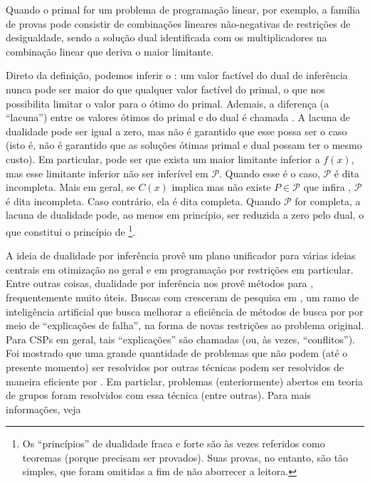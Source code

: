 \documentclass{article}
\begin{document}
Quando o primal for um problema de programação linear, por exemplo, a família de provas pode
consistir de combinações lineares não-negativas de restrições de desigualdade, sendo a solução dual
identificada com os multiplicadores na combinação linear que deriva o maior limitante.

Direto da definição, podemos inferir o : um valor factível
 do dual de inferência nunca pode ser maior do que qualquer valor factível do primal, o que
nos possibilita limitar o valor para o ótimo do primal.
Ademais, a diferença (a ``lacuna'') entre os valores ótimos do primal e do dual é chamada
. A lacuna de dualidade pode ser igual a zero, mas não é garantido
que esse possa ser o caso (isto é, não é garantido que as soluções ótimas primal e dual possam ter o
mesmo custo). Em particular, pode ser que exista um maior limitante inferior a $f(x)$, mas
esse limitante inferior não ser inferível em $\mathcal{P}$. Quando esse é o caso, $\mathcal{P}$ é
dita incompleta. Mais em geral, se $C(x)$ implica  mas não existe $P \in
\mathcal{P}$ que infira , $\mathcal{P}$ é dita incompleta. Caso contrário, ela é dita
completa. Quando $\mathcal{P}$ for completa, a lacuna de dualidade pode, ao menos em princípio, ser
reduzida a zero pelo dual, o que
constitui o princípio de \footnote{Os ``princípios'' de dualidade fraca e
  forte são às vezes referidos como teoremas (porque precisam ser provados). Suas provas, no
  entanto, são tão simples, que foram omitidas a fim de não aborrecer a leitora.}.

A ideia de dualidade por inferência provê um plano unificador para várias ideias centrais em
otimização no geral e em programação por restrições em particular. Entre outras coisas, dualidade
por inferência nos provê métodos para , frequentemente muito
úteis. Buscas com  cresceram de pesquisa em
, um ramo de inteligência artificial que busca melhorar
a eficiência de métodos de busca por  por meio de ``explicações de falha'',
na forma de novas restrições ao problema original. Para CSPs em geral, tais ``explicações'' são
chamadas  (ou, às vezes, ``conflitos''). Foi mostrado que uma grande quantidade de
problemas que não podem (até o presente momento) ser resolvidos por outras técnicas podem ser
resolvidos de maneira eficiente por . Em particlar, problemas
(enteriormente) abertos em teoria de grupos foram resolvidos com essa técnica (entre outras). Para
mais informações, veja \cite{beame}
\end{document}
